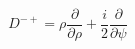 \begin{equation}
D^{-+}= \rho \frac{\partial}{\partial \rho} +\frac{i}{2} \frac{\partial}{\partial \psi}
\end{equation}


